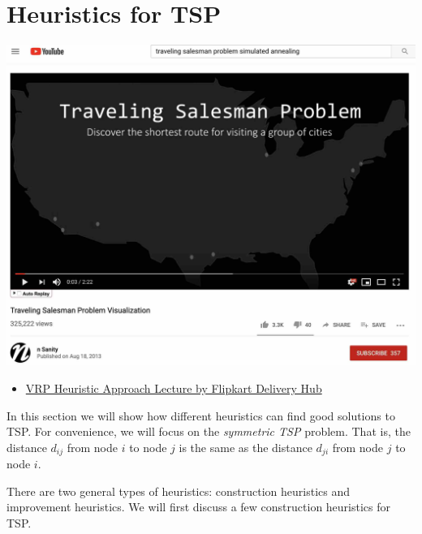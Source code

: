 
\chapter{Heuristics for TSP}

\begin{resource}

\begin{center}
\href{https://www.youtube.com/watch?v=SC5CX8drAtU}{\includegraphics[scale = 0.13]{optimization/figures/figures-static/youtube-tsp-simulated-annealing}}
\end{center}

\begin{itemize}
\item \href{https://www.youtube.com/watch?v=v9tUEsHD6BE&ab_channel=HasgeekTV}{VRP Heuristic Approach Lecture by Flipkart Delivery Hub}
\end{itemize}
\end{resource}
In this section we will show how different heuristics can find good solutions to TSP.  For convenience,  we will focus on the \emph{symmetric TSP} problem.  That is, the distance $d_{ij}$ from node $i$ to node $j$ is the same as the distance $d_{ji}$ from node $j$ to node $i$.

There are two general types of heuristics: construction heuristics and improvement heuristics.  We will first discuss a few construction heuristics for TSP.



